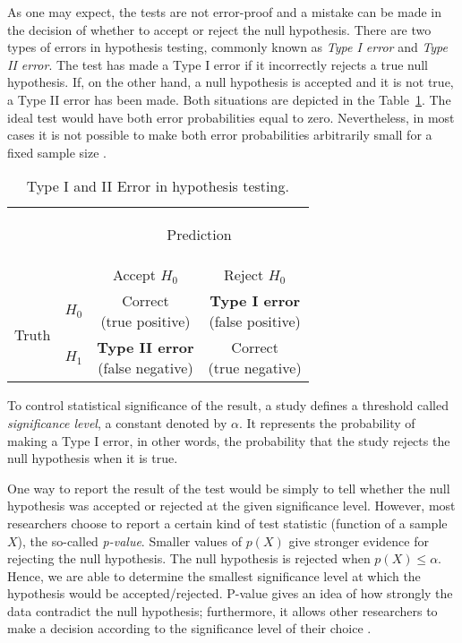 As one may expect, the tests are not error-proof and a mistake can be made in the decision of whether to accept or reject the null hypothesis. There are two types of errors in hypothesis testing, commonly known as \textit{Type I error} and \textit{Type II error}. The test has made a Type I error if it incorrectly rejects a true null hypothesis. If, on the other hand, a null hypothesis is accepted and it is not true, a Type II error has been made. Both situations are depicted in the Table~\ref{tab:hypothesis_testing_errors}. The ideal test would have both error probabilities equal to zero. Nevertheless, in most cases it is not possible to make both error probabilities arbitrarily small for a fixed sample size \cite{casella}.

\begin{table}[!htbp]
\centering
\renewcommand{\arraystretch}{2.5}
\begin{tabular}{l|l|c|c|}
\multicolumn{2}{c}{}&\multicolumn{2}{c}{\begin{Large}Prediction \end{Large}}\\
\cline{3-4}
\multicolumn{2}{c|}{}&Accept $H_{0}$&Reject $H_{0}$\\
\cline{2-4}
\multirow{2}{*}{\begin{Large}Truth\end{Large}}& \textbf{$H_{0}$} & \shortstack{Correct\\(true positive)} & \shortstack{\textbf{Type I error}\\(false positive)}\\
\cline{2-4}
& \textbf{$H_{1}$} & \shortstack{\textbf{Type II error}\\(false negative)} & \shortstack{Correct\\(true negative)} \\
\cline{2-4}
\end{tabular}
\caption{Type I and II Error in hypothesis testing.}\label{tab:hypothesis_testing_errors}
\end{table}

To control statistical significance of the result, a study defines a threshold called \textit{significance level}, a constant denoted by $\alpha$. It represents the probability  of making a Type I error, in other words, the probability that the study rejects the null hypothesis when it is true.

One way to report the result of the test would be simply to tell whether the null hypothesis was accepted or rejected at the given significance level. However, most researchers choose to report a certain kind of test statistic (function of a sample $X$), the so-called \textit{p-value}.
Smaller values of $p(X)$ give stronger evidence for rejecting the null hypothesis. The null hypothesis is rejected when $p(X) \leq \alpha$. Hence, we are able to determine the smallest significance level at which the hypothesis would be accepted/rejected. P-value gives an idea of how strongly the data contradict the null hypothesis; furthermore, it allows other researchers to make a decision according to the significance level of their choice \cite{sham_purcell, casella, lehmann}.

